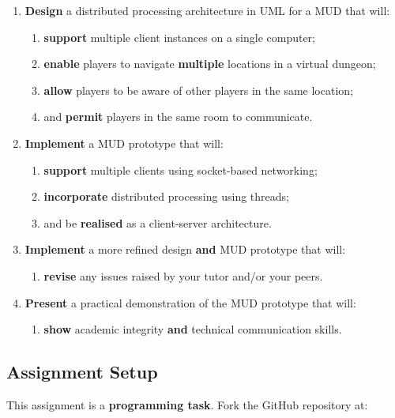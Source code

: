 \documentclass{../../fal_assignment}
\begin{document}
\begin{enumerate}[label=(\Alph*)]
    \item \textbf{Design} a distributed processing architecture in UML for a MUD that will:
    	\begin{enumerate}[label=\roman*.]
    		\item \textbf{support} multiple client instances on a single computer;
    		\item \textbf{enable} players to navigate \textbf{multiple} locations in a virtual dungeon;
    		\item \textbf{allow} players to be aware of other players in the same location;
    		\item and \textbf{permit} players in the same room to communicate.
	\end{enumerate}
    \item \textbf{Implement} a MUD prototype that will:
    	\begin{enumerate}[label=\roman*.]
    		\item \textbf{support} multiple clients using socket-based networking;
    		\item \textbf{incorporate} distributed processing using threads;
     		\item and be \textbf{realised} as a client-server architecture.
	\end{enumerate}
    \item \textbf{Implement} a more refined design \textbf{and} MUD prototype that will:
    	\begin{enumerate}[label=\roman*.]
    		\item \textbf{revise} any issues raised by your tutor and/or your peers.
	\end{enumerate}
    \item \textbf{Present} a practical demonstration of the MUD prototype that will:
    	\begin{enumerate}[label=\roman*.]
    		\item \textbf{show} academic integrity \textbf{and} technical communication skills.
	\end{enumerate}
\end{enumerate}

\subsection*{Assignment Setup}

This assignment is a \textbf{programming task}. Fork the GitHub repository at:
\end{document}

